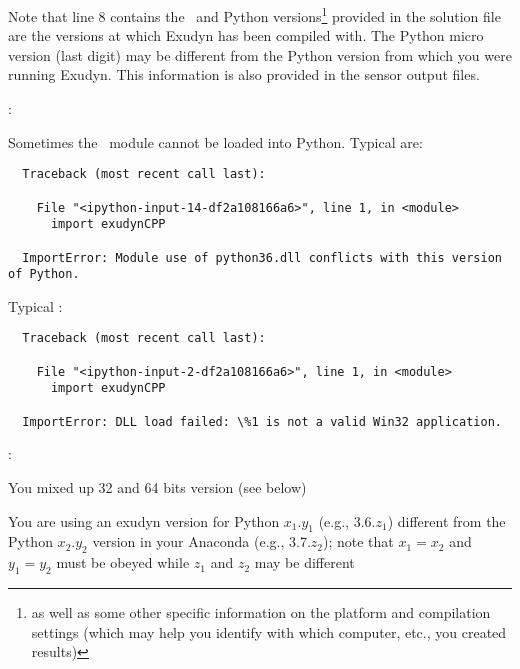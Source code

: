 Note that line 8 contains the \codeName\ and Python versions\footnote{as well as some other specific information on the platform and compilation settings (which may help you identify with which computer, etc., you created results)} provided in the solution file are the versions at which Exudyn has been compiled with.
The Python micro version (last digit) may be different from the Python version from which you were running Exudyn.
This information is also provided in the sensor output files.
%
\newpage
{}

\noindent {}:
\bi
  \item Sometimes the \codeName\ module cannot be loaded into Python. Typical  are: \vspace{1pt}\\
\plainlststyle
\begin{lstlisting}
  Traceback (most recent call last):

    File "<ipython-input-14-df2a108166a6>", line 1, in <module>
      import exudynCPP

  ImportError: Module use of python36.dll conflicts with this version of Python.
\end{lstlisting}
%
  Typical :\vspace{1pt}\\
\begin{lstlisting}
  Traceback (most recent call last):
  
    File "<ipython-input-2-df2a108166a6>", line 1, in <module>
      import exudynCPP

  ImportError: DLL load failed: \%1 is not a valid Win32 application.
\end{lstlisting}
%
  :
\bi
\item[$\ra$] You mixed up 32 and 64 bits version (see below) 
\item[$\ra$] You are using an exudyn version for Python $x_1.y_1$ (e.g., 3.6.$z_1$) different from the Python $x_2.y_2$ version in your Anaconda (e.g., 3.7.$z_2$); note that $x_1=x_2$ and $y_1=y_2$ must be obeyed while $z_1$ and $z_2$ may be different

